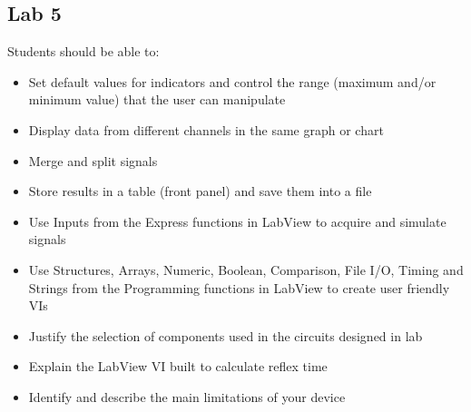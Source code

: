 \documentclass{article}
\begin{document}
\subsection*{Lab 5}
Students should be able to:
\begin{itemize}
	\item Set default values for indicators and control the range (maximum and/or minimum value) that the user can manipulate
	\item Display data from different channels in the same graph or chart
	\item Merge and split signals
	\item Store results in a table (front panel) and save them into a file
	\item Use Inputs from the Express functions in LabView to acquire and simulate signals
	\item Use Structures, Arrays, Numeric, Boolean, Comparison, File I/O, Timing and Strings from the Programming functions in LabView to create user friendly VIs
	\item Justify the selection of components used in the circuits designed in lab
	\item Explain the LabView VI built to calculate reflex time
	\item Identify and describe the main limitations of your device
\end{itemize}
\end{document}
